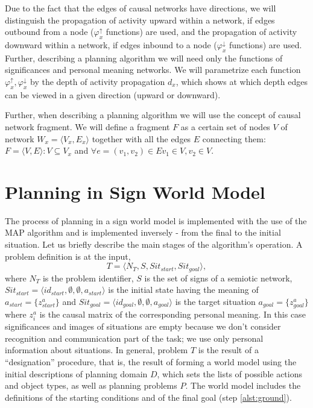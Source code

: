 \documentclass[review]{elsarticle}
\begin{document}
Due to the fact that the edges of causal networks have directions, we will distinguish the propagation of activity upward within a network, if edges outbound from a node ($\varphi_x^\uparrow$ functions) are used, and the propagation of activity downward within a network, if edges inbound to a node ($\varphi_x^\downarrow$ functions) are used. Further, describing a planning algorithm we will need only the functions of significances and personal meaning networks. We will parametrize each function $\varphi_x^\uparrow,\varphi_x^\downarrow$ by the depth of activity propagation $d_x$, which shows at which depth edges can be viewed in a given direction (upward or downward).

Further, when describing a planning algorithm we will use the concept of causal network fragment. We will define a fragment $F$ as a certain set of nodes $V$ of network $W_x=\langle V_x,E_x\rangle$ together with all the edges $E$ connecting them: $F=\langle V,E\rangle: V\subseteq V_x$ and $\forall e=(v_1,v_2)\in E v_1\in V, v_2\in V$.


\section{Planning in Sign World Model}\label{sec:plan}

The process of planning in a sign world model is implemented with the use of the MAP algorithm and is implemented inversely - from the final to the initial situation. Let us briefly describe the main stages of the algorithm's operation. A problem definition is at the input, 
\[
	T = \langle N_T,S,Sit_{start}, Sit_{goal}\rangle,
\]
where $N_T$ is the problem identifier, $S$ is the set of signs of a semiotic network, $Sit_{start}=\langle id_{start}, \emptyset, \emptyset, a_{start} \rangle$ is the initial state having the meaning of $a_{start}=\{z_{start}^a\}$ and $Sit_{goal}=\langle id_{goal}, \emptyset, \emptyset, a_{goal} \rangle$ is the target situation $a_{goal}=\{z_{goal}^a\}$ where $z^a_i$ is the causal matrix of the corresponding personal meaning. In this case significances and images of situations are empty because we don't consider recognition and communication part of the task; we use only personal information about situations. In general, problem $T$ is the result of a ``designation'' procedure, that is, the result of forming a world model using the initial descriptions of planning domain $D$, which sets the lists of possible actions and object types, as well as planning problems $P$. The world model includes the definitions of the starting conditions and of the final goal (step \ref{alst:ground}).
\end{document}
